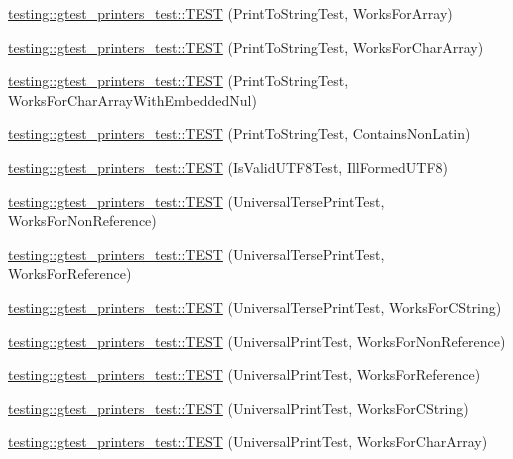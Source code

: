 \begin{DoxyCompactItemize}
\item 
\mbox{\hyperlink{namespacetesting_1_1gtest__printers__test_a78bd89af8a8505880b78ec2a001d3cb8}{testing\+::gtest\+\_\+printers\+\_\+test\+::\+T\+E\+ST}} (Print\+To\+String\+Test, Works\+For\+Array)
\item 
\mbox{\hyperlink{namespacetesting_1_1gtest__printers__test_ad122dc21e7ebad023d7048ef117a1129}{testing\+::gtest\+\_\+printers\+\_\+test\+::\+T\+E\+ST}} (Print\+To\+String\+Test, Works\+For\+Char\+Array)
\item 
\mbox{\hyperlink{namespacetesting_1_1gtest__printers__test_a65e208358dddc7747f4519410c71d877}{testing\+::gtest\+\_\+printers\+\_\+test\+::\+T\+E\+ST}} (Print\+To\+String\+Test, Works\+For\+Char\+Array\+With\+Embedded\+Nul)
\item 
\mbox{\hyperlink{namespacetesting_1_1gtest__printers__test_aa313c2e91ba3b712501d6e7f393a592a}{testing\+::gtest\+\_\+printers\+\_\+test\+::\+T\+E\+ST}} (Print\+To\+String\+Test, Contains\+Non\+Latin)
\item 
\mbox{\hyperlink{namespacetesting_1_1gtest__printers__test_a5d5349c44a2f23e585ea503cff88056e}{testing\+::gtest\+\_\+printers\+\_\+test\+::\+T\+E\+ST}} (Is\+Valid\+U\+T\+F8\+Test, Ill\+Formed\+U\+T\+F8)
\item 
\mbox{\hyperlink{namespacetesting_1_1gtest__printers__test_ab49ff6527b0b01411b725fe46e1af65c}{testing\+::gtest\+\_\+printers\+\_\+test\+::\+T\+E\+ST}} (Universal\+Terse\+Print\+Test, Works\+For\+Non\+Reference)
\item 
\mbox{\hyperlink{namespacetesting_1_1gtest__printers__test_ab7adb58a0e08e0830157a5a1c7bceac5}{testing\+::gtest\+\_\+printers\+\_\+test\+::\+T\+E\+ST}} (Universal\+Terse\+Print\+Test, Works\+For\+Reference)
\item 
\mbox{\hyperlink{namespacetesting_1_1gtest__printers__test_ab11252e228a240a349d747546bc222d2}{testing\+::gtest\+\_\+printers\+\_\+test\+::\+T\+E\+ST}} (Universal\+Terse\+Print\+Test, Works\+For\+C\+String)
\item 
\mbox{\hyperlink{namespacetesting_1_1gtest__printers__test_a43d4efc91c2ea7d8220891df9b0437df}{testing\+::gtest\+\_\+printers\+\_\+test\+::\+T\+E\+ST}} (Universal\+Print\+Test, Works\+For\+Non\+Reference)
\item 
\mbox{\hyperlink{namespacetesting_1_1gtest__printers__test_a58ad7c81884e852b09646764ce14a47e}{testing\+::gtest\+\_\+printers\+\_\+test\+::\+T\+E\+ST}} (Universal\+Print\+Test, Works\+For\+Reference)
\item 
\mbox{\hyperlink{namespacetesting_1_1gtest__printers__test_ac20aca012aca1ca9589dbf7483fbbbd1}{testing\+::gtest\+\_\+printers\+\_\+test\+::\+T\+E\+ST}} (Universal\+Print\+Test, Works\+For\+C\+String)
\item 
\mbox{\hyperlink{namespacetesting_1_1gtest__printers__test_a23a9eda97679bfc29c87b8de17cc35bf}{testing\+::gtest\+\_\+printers\+\_\+test\+::\+T\+E\+ST}} (Universal\+Print\+Test, Works\+For\+Char\+Array)
\end{DoxyCompactItemize}


